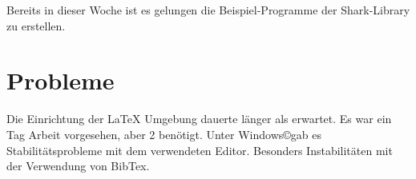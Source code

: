 \documentclass[a4paper,12pt,fleqn]{scrartcl}
\begin{document}
Bereits in dieser Woche ist es gelungen die Beispiel-Programme der Shark-Library
zu erstellen.

\section[Probleme]{Probleme}
Die Einrichtung der \LaTeX{} Umgebung dauerte länger als erwartet. Es war ein
Tag Arbeit
vorgesehen, aber 2 benötigt. \newline
Unter Windows\copyright gab es Stabilitätsprobleme mit dem verwendeten Editor.
Besonders Instabilitäten mit der Verwendung von BibTex.


\end{document}
